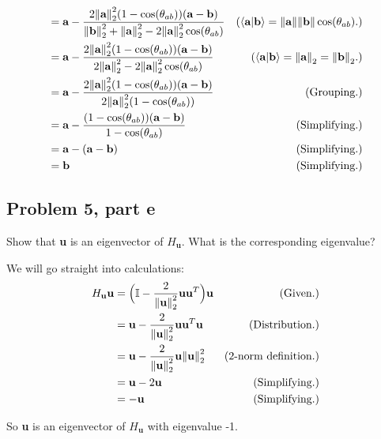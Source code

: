 \begin{solution}
{\begin{align*}
        &= \textbf{a}- \frac{2\norm{\textbf{a}}_2^2 (1 - \cos(\theta_{ab}))(\textbf{a} - \textbf{b})}{\norm{\textbf{b}}_2^2 + \norm{\textbf{a}}_2^2 - 2\norm{\textbf{a}}_2^2\cos(\theta_{ab})} &(\braket{\textbf{a}}{\textbf{b}} = \norm{\textbf{a}}\norm{\textbf{b}}\cos(\theta_{ab}).)\\
        &= \textbf{a}- \frac{2\norm{\textbf{a}}_2^2 (1 - \cos(\theta_{ab}))(\textbf{a} - \textbf{b})}{2\norm{\textbf{a}}_2^2 - 2\norm{\textbf{a}}_2^2\cos(\theta_{ab})} &(\braket{\textbf{a}}{\textbf{b}} = \norm{\textbf{a}}_2 = \norm{\textbf{b}}_2.)\\
        &= \textbf{a}- \frac{2\norm{\textbf{a}}_2^2 (1 - \cos(\theta_{ab}))(\textbf{a} - \textbf{b})}{2\norm{\textbf{a}}_2^2(1 - \cos(\theta_{ab}))} &\text{(Grouping.)}\\
        &= \textbf{a}- \frac{(1 - \cos(\theta_{ab}))(\textbf{a} - \textbf{b})}{1 - \cos(\theta_{ab})} &\text{(Simplifying.)}\\
        &= \textbf{a} - (\textbf{a} - \textbf{b}) &\text{(Simplifying.)}\\
        &= \textbf{b} &\text{(Simplifying.)}
    \end{align*}
    \vspace{-10mm}
    \alignbreak
}%
\end{solution}

\newpage
\subsection{Problem 5, part e}
Show that \textbf{u} is an eigenvector of $H_\textbf{u}$. What is the corresponding eigenvalue?
\partbreak
\begin{solution}

    We will go straight into calculations:
    \alignbreak
    \begin{align*}
        H_\textbf{u}\textbf{u} &= \Big(\mathbb{I} - \frac{2}{\norm{\textbf{u}}_2^2}\textbf{u}\textbf{u}^T\Big)\textbf{u} &\text{(Given.)}\\
        &= \textbf{u} - \frac{2}{\norm{\textbf{u}}_2^2}\textbf{u}\textbf{u}^T\textbf{u} &\text{(Distribution.)}\\
        &= \textbf{u} - \frac{2}{\norm{\textbf{u}}_2^2}\textbf{u}\norm{\textbf{u}}_2^2 &\text{(2-norm definition.)}\\
        &= \textbf{u} - 2\textbf{u} &\text{(Simplifying.)}\\
        &= -\textbf{u} &\text{(Simplifying.)}
    \end{align*}
    \alignbreak

    So \textbf{u} is an eigenvector of $H_\textbf{u}$ with eigenvalue -1.
\end{solution}

